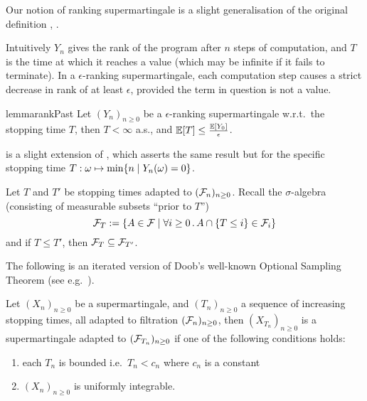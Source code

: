 \begin{remark}
Our notion of ranking supermartingale is a slight generalisation of the original definition \cite{DBLP:conf/cav/ChakarovS13,DBLP:conf/popl/FioritiH15}, .
\end{remark}

Intuitively $Y_n$ gives the rank of the program after $n$ steps of computation, and $T$ is the time at which it reaches a value (which may be infinite if it fails to terminate).
In a $\epsilon$-ranking supermartingale, each computation step causes a strict decrease in rank of at least $\epsilon$, provided the term in question is not a value.

\begin{restatable}{lemma}{rankPast}
\label{lem:rank-PAST}
Let $(Y_n)_{n \geq 0}$ be a $\epsilon$-ranking supermartingale w.r.t.~the stopping time $T$, then $T < \infty$ a.s., and $\mathbb{E}[T] \leq \frac{\mathbb{E}[Y_0]}{\epsilon}$.
\end{restatable}

\begin{remark}
 is a slight extension of \cite[Lem.~5.5]{DBLP:conf/popl/FioritiH15},
which asserts the same result but for the specific stopping time $T : \omega \mapsto \min\{n \mid Y_n(\omega) = 0\}$.
\end{remark}

Let $T$ and $T'$ be stopping times adapted to $(\mathcal{F}_n)_{n \geq 0}$.
Recall the $\sigma$-algebra (consisting of measurable subsets ``prior to $T$'')
\[
\mathcal{F}_T := \{A \in \mathcal{F} \mid \forall i \geq 0 \, . \, A \cap \{T \leq i\} \in \mathcal{F}_i\}
\]
and if $T \leq T'$, then $\mathcal{F}_{T} \subseteq \mathcal{F}_{T'}$.

The following is an iterated version of Doob's well-known Optional Sampling Theorem 
(see e.g.~\cite{AshDD00,DBLP:conf/popl/FioritiH15}).
\begin{theorem}
\label{thm:optional sampling}
Let $(X_n)_{n \geq 0}$ be a supermartingale, and $(T_n)_{n \geq 0}$ a sequence of increasing stopping times, all adapted to filtration $(\mathcal{F}_n)_{n \geq 0}$, then $(X_{T_n})_{n \geq 0}$ is a supermartingale adapted to $(\mathcal{F}_{T_n})_{n \geq 0}$ if one of the following conditions holds:
\begin{enumerate}
\item each $T_n$ is bounded i.e.~$T_n < c_n$ where $c_n$ is a constant
\item $(X_n)_{n \geq 0}$ is uniformly integrable.
\end{enumerate}
\end{theorem}

